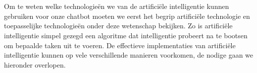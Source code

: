 \chapter{}%
\label{ch:stand-van-zaken}



%
%
%


Om te weten welke technologieën we van de artificiële intelligentie kunnen gebruiken voor onze chatbot moeten we eerst het begrip artificiële technologie en toepasselijke technologieën onder deze wetenschap bekijken. Zo is artificiële intelligentie simpel gezegd een algoritme dat intelligentie probeert na te bootsen om bepaalde taken uit te voeren. De effectieve implementaties van artificiële intelligentie kunnen op vele verschillende manieren voorkomen, de nodige gaan we hieronder overlopen. 

